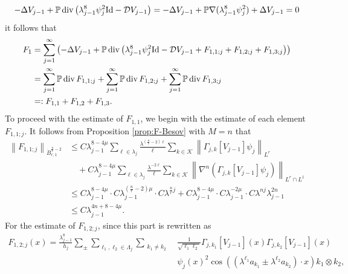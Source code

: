 \documentclass[a4paper,12pt,reqno]{amsart}
\theoremstyle{plain}
\theoremstyle{definition}
\renewcommand{\div}{\operatorname{div}}
\newcommand{\dB}{\dot{B}}
\renewcommand{\leq}{\leqslant}
\newcommand{\n}[1]{{\left\|#1\right\|}}
\newcommand{\Id}{{\rm Id}}
\renewcommand{\sp}[1]{\left(#1\right)}
\begin{document}
\begin{align}
    -\Delta V_{j-1} + \mathbb{P}\div \sp{\lambda_{j-1}^8\psi_{j}^2\Id - \mathcal{D}V_{j-1}}
    =
    -\Delta V_{j-1} + \mathbb{P}\nabla (\lambda_{j-1}^8\psi_{j}^2) + \Delta V_{j-1}
    =
    0
\end{align}
it follows that
\begin{align}
    F_1
    &
    =
    \sum_{j=1}^{\infty}\sp{-\Delta V_{j-1} + \mathbb{P}\div \sp{\lambda_{j-1}^8\psi_{j}^2\Id - \mathcal{D}V_{j-1}
    +F_{1,1;j}
    +F_{1,2;j}
    +F_{1,3;j}}}
    \\
    &
    =
    \sum_{j=1}^{\infty}
    \mathbb{P}\div F_{1,1;j}
    +
    \sum_{j=1}^{\infty}
    \mathbb{P}\div F_{1,2;j}
    +
    \sum_{j=1}^{\infty}
    \mathbb{P}\div F_{1,3;j}
    \\
    &
    =: F_{1,1} + F_{1,2} + F_{1,3}.
\end{align}
To proceed with the estimate of $F_{1,1}$, 
we begin with the estimate of each element $F_{1,1;j}$.
It follows from Proposition \ref{prop:F-Besov} with $M=n$ that 
\begin{align}
    \n{F_{1,1;j}}_{\dB_{r,1}^{\frac{n}{r}-2}}
    &
    \leq 
    C\lambda_{j-1}^{8-4\mu}
    \sum_{\ell \in \lambda_j}\frac{\lambda^{(\frac{n}{r}-2)\ell}}{\ell}
    \sum_{k \in \mathcal{K}}
    \n{\Gamma_{j,k}[V_{j-1}]\psi_{j}}_{L^r}
    \\
    &\quad
    +
    C\lambda_{j-1}^{8-4\mu}
    \sum_{\ell \in \lambda_j}\frac{\lambda^{-2\ell}}{\ell}
    \sum_{k \in \mathcal{K}}
    \n{\nabla^n(\Gamma_{j,k}[V_{j-1}]\psi_{j})}_{L^r\cap L^1}
    \\
    &
    \leq 
    C
    \lambda_{j-1}^{8-4\mu}\cdot C\lambda_{j-1}^{(\frac{n}{r}-2)\mu}\cdot C\lambda^{\frac{n}{r}j}
    +
    C\lambda_{j-1}^{8-4\mu}\cdot C\lambda_{j-1}^{-2\mu}\cdot C\lambda^{nj}\lambda_{j-1}^{2n}
    \\
    &
    \leq 
    C\lambda_{j-1}^{4n+8-4\mu}.
\end{align}
For the estimate of $F_{1,2;j}$, since this part is rewritten as
\begin{align}
    F_{1,2;j}(x)
    =
    \frac{\lambda_{j-1}^{8}}{h_j}
    \sum_{\pm}
    \sum_{\ell_1,\ell_2 \in \Lambda_j}
    \sum_{\substack{k_1 \neq k_2}}
    &
    \frac{1}{\sqrt{\ell_1\ell_2}}
    \Gamma_{j,k_1}[V_{j-1}](x)
    \Gamma_{j,k_2}[V_{j-1}](x)
    \\
    &
    \psi_{j}(x)^2
    \cos\sp{(\lambda^{\ell_1}a_{k_1}\pm\lambda^{\ell_2}a_{k_2})\cdot x}
    k_1 \otimes k_2,
\end{align}
\end{document}
